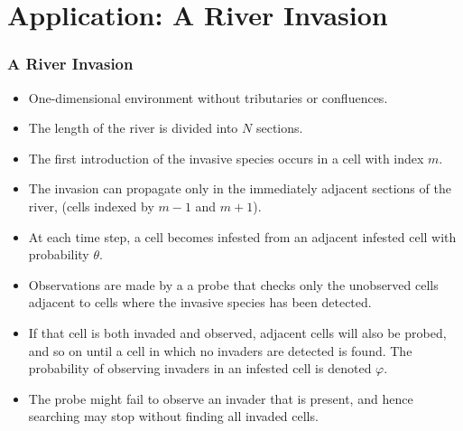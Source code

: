 \documentclass[9pt, xcolor={dvipsnames,svgnames,table}]{beamer}
\begin{document}
\section{Application: A River Invasion}

\begin{frame}
\frametitle{A River Invasion}
    \begin{itemize}
        \item One-dimensional environment without tributaries or confluences. 
        \item The length of the river is divided into $N$ sections.
        \item The first introduction of the invasive species occurs in a cell with index $m$.
        \item The invasion can propagate only in the immediately adjacent sections of the river, (cells indexed by $m-1$ and $m+1$).
        \item At each time step, a cell becomes infested from an adjacent infested cell with probability $\theta$.
        \item Observations are made by a a probe that checks only the unobserved cells adjacent to cells where the invasive species has been detected.
        \item If that cell is both invaded and observed, adjacent cells will also be probed, and so on until a cell in which no invaders are detected is found.  The probability of observing invaders in an infested cell is denoted $\varphi$.
        \item The probe might fail to observe an invader that is present, and hence searching may stop without finding all invaded cells.
    \end{itemize}
\end{frame}
\end{document}
